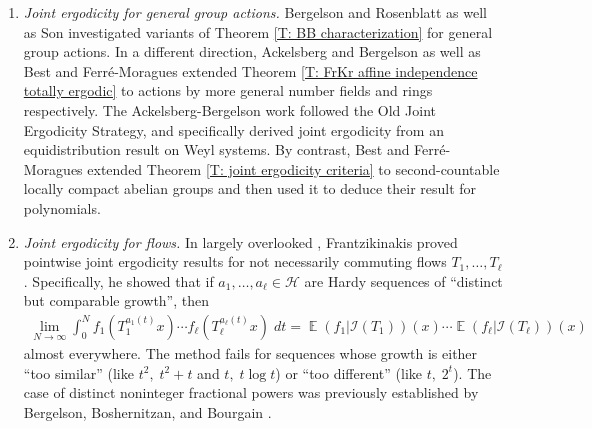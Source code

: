 \documentclass[11pt]{amsart}
\theoremstyle{definition}
\DeclareMathOperator*{\E}{\mathbb{E}}
\newcommand{\C}{{\mathbb C}}
\newcommand{\F}{{\mathbb F}}
\newcommand{\CH}{{\mathcal H}}
\newcommand{\CI}{{\mathcal I}}
\newcommand{\1}{{\mathbf{1}}}
\begin{document}
\begin{enumerate}
\begin{align*}
    \end{align*}
    for 1-bounded functions $f_0,f_1,f_2:\F_p\to\C$. More results on this form were proved by Peluse \cite{Pel18, Pel19}, Dong-Li-Sawin \cite{DLS17}, Han-Lacey-Yang \cite{HLY21}, Bergelson-Best \cite{BB23a}, and the author \cite{Kuc23, Kuc22b}. Due to parallels with joint ergodicity, Bergelson and Best refer to this phenomenon as \emph{asymptotic joint ergodicity} \cite{BB23b}.
    \item \emph{Joint ergodicity for general group actions.} Bergelson and Rosenblatt \cite{BR99} as well as Son \cite{Son20} investigated variants of Theorem \ref{T: BB characterization} for general group actions. 
    In a different direction, Ackelsberg and Bergelson \cite{AB24} as well as Best and Ferr\'e-Moragues \cite{BFM22} extended Theorem \ref{T: FrKr affine independence totally ergodic} to actions by more general number fields and rings respectively. The Ackelsberg-Bergelson work followed the Old Joint Ergodicity Strategy, and specifically derived joint ergodicity from an equidistribution result on Weyl systems. By contrast, Best and Ferr\'e-Moragues extended Theorem \ref{T: joint ergodicity criteria} to second-countable locally compact abelian groups and then used it to deduce their result for polynomials.
    \item \emph{Joint ergodicity for flows.} In largely overlooked \cite[Chapter 7]{Fr21}, Frantzikinakis proved pointwise joint ergodicity results for not necessarily commuting flows $T_1,\ldots, T_\ell$. Specifically, he showed that if $a_1, \ldots, a_\ell\in\CH$ are Hardy sequences of ``distinct but comparable growth'', then 
    \begin{align*}
        \lim_{N\to\infty}\int_0^N f_1(T_1^{a_1(t)}x)\cdots f_\ell(T_\ell^{a_\ell(t)}x)\; dt = \E(f_1|\CI(T_1))(x)\cdots \E(f_\ell|\CI(T_\ell))(x)
    \end{align*}
    almost everywhere.
    The method fails for sequences whose growth is either ``too similar'' (like $t^2,\; t^2+t$ and $t,\; t\log t$) or ``too different'' (like $t,\; 2^t$). The case of distinct noninteger fractional powers was previously established by Bergelson, Boshernitzan, and Bourgain \cite{BBB94}.
\end{enumerate}
\end{document}
